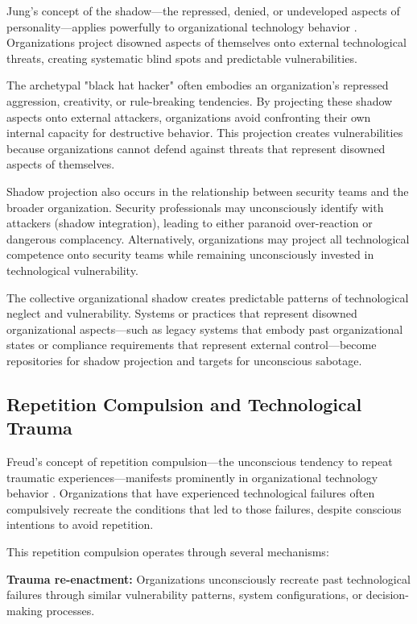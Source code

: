 \documentclass[10pt, twocolumn]{article}
\begin{document}
Jung's concept of the shadow—the repressed, denied, or undeveloped aspects of personality—applies powerfully to organizational technology behavior \cite{jung1969}. Organizations project disowned aspects of themselves onto external technological threats, creating systematic blind spots and predictable vulnerabilities.

The archetypal "black hat hacker" often embodies an organization's repressed aggression, creativity, or rule-breaking tendencies. By projecting these shadow aspects onto external attackers, organizations avoid confronting their own internal capacity for destructive behavior. This projection creates vulnerabilities because organizations cannot defend against threats that represent disowned aspects of themselves.

Shadow projection also occurs in the relationship between security teams and the broader organization. Security professionals may unconsciously identify with attackers (shadow integration), leading to either paranoid over-reaction or dangerous complacency. Alternatively, organizations may project all technological competence onto security teams while remaining unconsciously invested in technological vulnerability.

The collective organizational shadow creates predictable patterns of technological neglect and vulnerability. Systems or practices that represent disowned organizational aspects—such as legacy systems that embody past organizational states or compliance requirements that represent external control—become repositories for shadow projection and targets for unconscious sabotage.

\subsection{Repetition Compulsion and Technological Trauma}

Freud's concept of repetition compulsion—the unconscious tendency to repeat traumatic experiences—manifests prominently in organizational technology behavior \cite{freud1920}. Organizations that have experienced technological failures often compulsively recreate the conditions that led to those failures, despite conscious intentions to avoid repetition.

This repetition compulsion operates through several mechanisms:

\textbf{Trauma re-enactment:} Organizations unconsciously recreate past technological failures through similar vulnerability patterns, system configurations, or decision-making processes.
\end{document}
